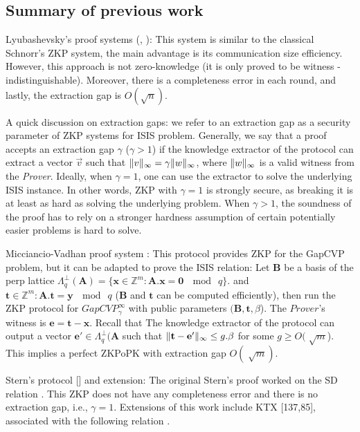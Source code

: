 \subsection*{Summary of previous work}
\begin{description}
\item Lyubashevsky's proof systems (\cite{lyubashevsky2008lattice},
  \cite{lyubashevsky2009fiat}): This system is similar to the classical Schnorr's
  ZKP system, the main advantage is its communication size efficiency. However,
  this approach is not zero-knowledge (it is only proved to be witness
 -indistinguishable). Moreover, there is a completeness error in each round, and
  lastly, the extraction gap is $O(\sqrt{n})$.

  A quick discussion on extraction gaps: we refer to an extraction gap as a security
  parameter of ZKP systems for ISIS problem. Generally, we say that a proof accepts
  an extraction gap $\gamma$ ($\gamma > 1$) if the knowledge extractor of the
  protocol can extract a vector $\vec{v}$ such that
  $\Vert v \Vert_{\infty} = \gamma \Vert w \Vert_{\infty}$, where $\Vert w \Vert_{\infty}$ is a valid witness
  from the \emph{Prover}. Ideally, when $\gamma = 1$, one can use the extractor
  to solve the underlying ISIS instance. In other words, ZKP with $\gamma = 1$
  is strongly secure, as breaking it is at least as hard as solving the
  underlying problem. When $\gamma > 1$, the soundness of the proof has to rely
  on a stronger hardness assumption of certain potentially easier problems is hard
  to solve.
\item Micciancio-Vadhan proof system \cite{micciancio2003statistical}: This
  protocol provides ZKP for the GapCVP problem, but it can be adapted to prove the ISIS
  relation: Let $\mathbf{B}$ be a basis of the perp lattice
  $\Lambda_q^\bot(\mathbf{A}) = \{\mathbf{x} \in \mathbb{Z}^m: \mathbf{A.x = 0}\
  \mod \ q\}$.  and $\mathbf{t} \in \mathbb{Z}^m: \mathbf{A.t = y}\ \mod \ q$
  ($\mathbf{B}$ and $\mathbf{t}$ can be computed efficiently), then run the ZKP
  protocol for $GapCVP_\gamma^\infty$ with public parameters
  $(\mathbf{B,t},\beta$). The $Prover$'s witness is $\mathbf{e = t - x}$. Recall
  that The knowledge extractor of the protocol can output a vector
  $\mathbf{e'} \in \Lambda_q^\bot( \mathbf{A}$ such that
  $\Vert \mathbf{ t - e'} \Vert_{\infty} \leq g.\beta$ for some $g \geq O(\sqrt[]
  {m}$). This implies a perfect ZKPoPK with extraction gap $O(\sqrt[]{m})$.
\item Stern's protocol [\todo{citeStern}] and extension: The original Stern's
  proof worked on the SD relation \todo{SD relation}. This ZKP does not have any
  completeness error and there is no extraction gap, i.e., $\gamma =
  1$. Extensions of this work include KTX [137,85], associated with the
  following relation \todo{ktxRelation}.


\end{description}
